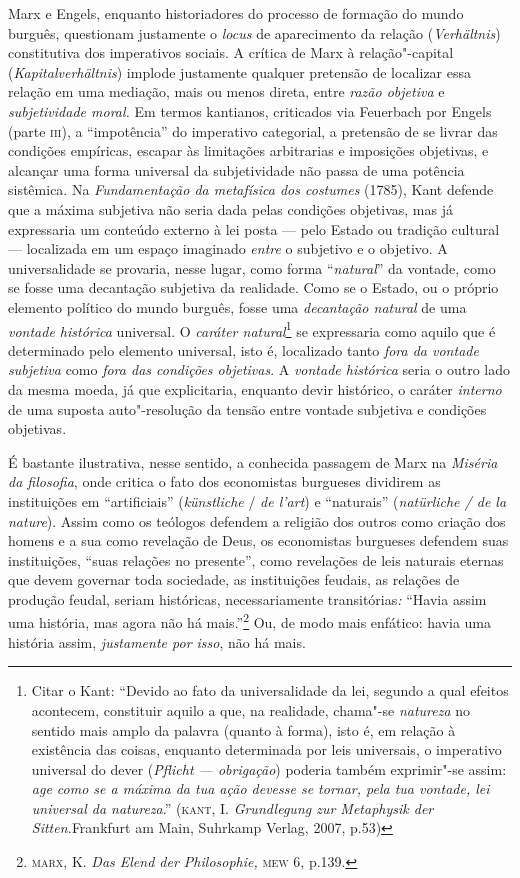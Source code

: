 Marx e Engels, enquanto historiadores do processo de formação do mundo
burguês, questionam justamente o \emph{locus} de aparecimento da relação
(\emph{Verhältnis}) constitutiva dos imperativos sociais. A crítica de
Marx à relação"-capital (\emph{Kapitalverhältnis}) implode justamente
qualquer pretensão de localizar essa relação em uma mediação, mais ou
menos direta, entre \emph{razão objetiva} e \emph{subjetividade moral.}
Em termos kantianos, criticados via Feuerbach por Engels (parte
\textsc{iii}), a ``impotência'' do imperativo categorial, a pretensão de
se livrar das condições empíricas, escapar às limitações arbitrarias e
imposições objetivas, e alcançar uma forma universal da subjetividade
não passa de uma potência sistêmica. Na \emph{Fundamentação da
metafísica dos costumes} (1785), Kant defende que a máxima subjetiva não
seria dada pelas condições objetivas, mas já expressaria um conteúdo
externo à lei posta --- pelo Estado ou tradição cultural --- localizada
em um espaço imaginado \emph{entre} o subjetivo e o objetivo. A
universalidade se provaria, nesse lugar, como forma ``\emph{natural}''
da vontade, como se fosse uma decantação subjetiva da realidade. Como se
o Estado, ou o próprio elemento político do mundo burguês, fosse uma
\emph{decantação natural} de uma \emph{vontade histórica} universal. O
\emph{caráter natural}\footnote{Citar o Kant: ``Devido ao fato da
  universalidade da lei, segundo a qual efeitos acontecem, constituir
  aquilo a que, na realidade, chama"-se \emph{natureza} no sentido mais
  amplo da palavra (quanto à forma), isto é, em relação à existência das
  coisas, enquanto determinada por leis universais, o imperativo
  universal do dever (\emph{Pflicht --- obrigação}) poderia também
  exprimir"-se assim: \emph{age como se a máxima da tua ação devesse se
  tornar, pela tua vontade, lei universal da natureza}.''
  (\textsc{kant}, I. \emph{Grundlegung zur Metaphysik der
  Sitten.}Frankfurt am Main, Suhrkamp Verlag, 2007, p.53)} se
expressaria como aquilo que é determinado pelo elemento universal, isto
é, localizado tanto \emph{fora da vontade subjetiva} como \emph{fora das
condições objetivas}. A \emph{vontade histórica} seria o outro lado da
mesma moeda, já que explicitaria, enquanto devir histórico, o caráter
\emph{interno} de uma suposta auto"-resolução da tensão entre vontade
subjetiva e condições objetivas.

É bastante ilustrativa, nesse sentido, a conhecida passagem de Marx na
\emph{Miséria da filosofia}, onde critica o fato dos economistas
burgueses dividirem as instituições em ``artificiais''
(\emph{künstliche} / \emph{de l'art}) e ``naturais'' (\emph{natürliche /
de la nature}). Assim como os teólogos defendem a religião dos outros
como criação dos homens e a sua como revelação de Deus, os economistas
burgueses defendem suas instituições, ``suas relações no presente'',
como revelações de leis naturais eternas que devem governar toda
sociedade, as instituições feudais, as relações de produção feudal,
seriam históricas, necessariamente transitórias\emph{:} ``Havia assim
uma história, mas agora não há mais.''\footnote{\textsc{marx}, K.
  \emph{Das Elend der Philosophie,} \textsc{mew} 6, p.139.} Ou, de modo
mais enfático: havia uma história assim, \emph{justamente por isso}, não
há mais.

